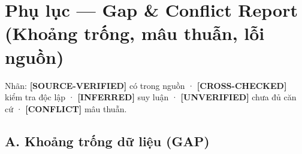 \documentclass[
  10pt,
  twoside,openany]{book}
\begin{document}
\hypertarget{phux1ee5-lux1ee5c-gap-conflict-report-khoux1ea3ng-trux1ed1ng-muxe2u-thuux1eabn-lux1ed7i-nguux1ed3n}{%
\chapter{Phụ lục --- Gap \& Conflict Report (Khoảng trống, mâu thuẫn,
lỗi
nguồn)}\label{phux1ee5-lux1ee5c-gap-conflict-report-khoux1ea3ng-trux1ed1ng-muxe2u-thuux1eabn-lux1ed7i-nguux1ed3n}}

Nhãn: \textbf{{[}SOURCE-VERIFIED{]}} có trong nguồn ·
\textbf{{[}CROSS-CHECKED{]}} kiểm tra độc lập · \textbf{{[}INFERRED{]}}
suy luận · \textbf{{[}UNVERIFIED{]}} chưa đủ căn cứ ·
\textbf{{[}CONFLICT{]}} mâu thuẫn.

\hypertarget{a.-khoux1ea3ng-trux1ed1ng-dux1eef-liux1ec7u-gap}{%
\section{A. Khoảng trống dữ liệu
(GAP)}\label{a.-khoux1ea3ng-trux1ed1ng-dux1eef-liux1ec7u-gap}}
\end{document}
